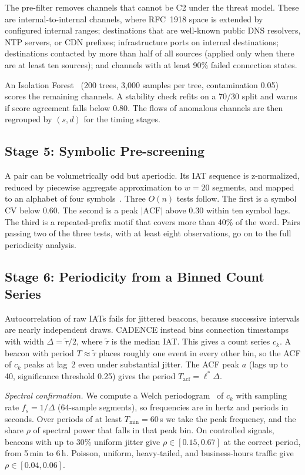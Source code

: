 \documentclass[runningheads]{llncs}
\begin{document}
The pre-filter removes channels that cannot be C2 under the threat model. These are internal-to-internal channels, where RFC~1918 space is extended by configured internal ranges; destinations that are well-known public DNS resolvers, NTP servers, or CDN prefixes; infrastructure ports on internal destinations; destinations contacted by more than half of all sources (applied only when there are at least ten sources); and channels with at least 90\% failed connection states.

An Isolation Forest~\cite{liu2008iforest} (200 trees, 3{,}000 samples per tree, contamination 0.05) scores the remaining channels. A stability check refits on a 70/30 split and warns if score agreement falls below 0.80. The flows of anomalous channels are then regrouped by $(s,d)$ for the timing stages.

\subsection{Stage 5: Symbolic Pre-screening}

A pair can be volumetrically odd but aperiodic. Its IAT sequence is z-normalized, reduced by piecewise aggregate approximation to $w{=}20$ segments, and mapped to an alphabet of four symbols~\cite{lin2003sax}. Three $O(n)$ tests follow. The first is a symbol CV below 0.60. The second is a peak $|\text{ACF}|$ above 0.30 within ten symbol lags. The third is a repeated-prefix motif that covers more than 40\% of the word. Pairs passing two of the three tests, with at least eight observations, go on to the full periodicity analysis.

\subsection{Stage 6: Periodicity from a Binned Count Series}\label{sec:spectral}

Autocorrelation of raw IATs fails for jittered beacons, because successive intervals are nearly independent draws. CADENCE instead bins connection timestamps with width $\Delta = \tilde{\tau}/2$, where $\tilde{\tau}$ is the median IAT. This gives a count series $c_k$. A beacon with period $T \approx \tilde{\tau}$ places roughly one event in every other bin, so the ACF of $c_k$ peaks at lag~2 even under substantial jitter. The ACF peak $a$ (lags up to 40, significance threshold 0.25) gives the period $T_{\text{acf}} = \ell^\ast \Delta$.

\emph{Spectral confirmation.} We compute a Welch periodogram~\cite{welch1967} of $c_k$ with sampling rate $f_s = 1/\Delta$ (64-sample segments), so frequencies are in hertz and periods in seconds. Over periods of at least $T_{\min}=60$\,s we take the peak frequency, and the share $\rho$ of spectral power that falls in that peak bin. On controlled signals, beacons with up to 30\% uniform jitter give $\rho \in [0.15, 0.67]$ at the correct period, from 5\,min to 6\,h. Poisson, uniform, heavy-tailed, and business-hours traffic give $\rho \in [0.04, 0.06]$.
\end{document}
